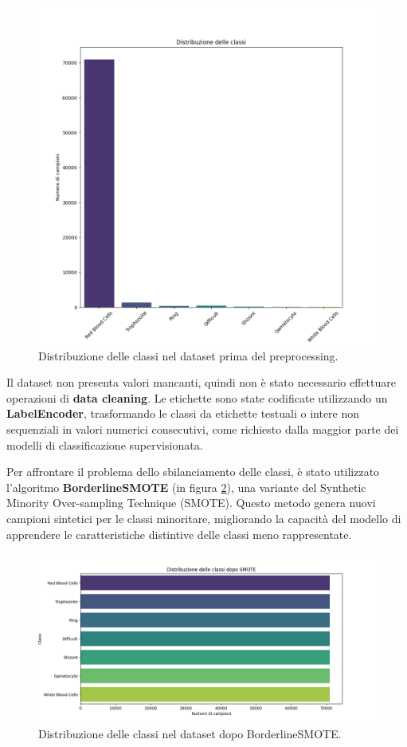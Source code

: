 \documentclass[minted, draw]{../tex/hebdomon}
\begin{document}
% 
\begin{figure}[H]
  \centering
  \includegraphics[width=.7\linewidth]{figures/class_distribution.png}
  \caption{Distribuzione delle classi nel dataset prima del preprocessing.}
  \label{fig:sbilanciamento}
\end{figure}
%

Il dataset non presenta valori mancanti, quindi non è stato necessario effettuare operazioni di \textbf{data cleaning}. Le etichette sono state codificate utilizzando un \textbf{LabelEncoder}, trasformando le classi da etichette testuali o intere non sequenziali in valori numerici consecutivi, come richiesto dalla maggior parte dei modelli di classificazione supervisionata.

Per affrontare il problema dello sbilanciamento delle classi, è stato utilizzato l'algoritmo \textbf{BorderlineSMOTE} (in figura \ref{fig:BorderlineSMOTE}), una variante del Synthetic Minority Over-sampling Technique (SMOTE). Questo metodo genera nuovi campioni sintetici per le classi minoritare, migliorando la capacità del modello di apprendere le caratteristiche distintive delle classi meno rappresentate.
% 
\begin{figure}[H]
  \centering
  \includegraphics[width=.9\linewidth]{figures/class_distribution_after_smote.png}
  \caption{Distribuzione delle classi nel dataset dopo BorderlineSMOTE.}
  \label{fig:BorderlineSMOTE}
\end{figure}
%
\end{document}
